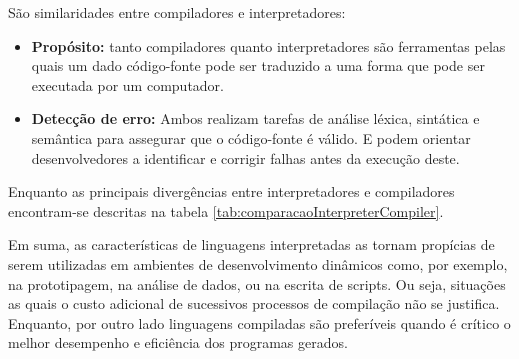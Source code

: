  {
	São similaridades entre compiladores e interpretadores:

	\begin{itemize}
		\item \textbf{Propósito:} tanto compiladores quanto interpretadores são
		      ferramentas pelas quais um dado código-fonte pode ser traduzido a
		      uma forma que pode ser executada por um computador.

		\item \textbf{Detecção de erro:} Ambos realizam tarefas de análise
		      léxica, sintática e semântica para assegurar que o código-fonte é
		      válido. E podem orientar desenvolvedores a identificar e corrigir
		      falhas antes da execução deste.
	\end{itemize}

	Enquanto as principais divergências entre interpretadores e compiladores
	encontram-se descritas na tabela \ref{tab:comparacaoInterpreterCompiler}.
	
	Em suma, as características de linguagens interpretadas as tornam propícias
	de serem utilizadas em ambientes de desenvolvimento dinâmicos como, por
	exemplo, na prototipagem, na análise de dados, ou na escrita de scripts. Ou
	seja, situações as quais o custo adicional de sucessivos processos de
	compilação não se justifica. Enquanto, por outro lado linguagens compiladas
	são preferíveis quando é crítico o melhor desempenho e eficiência dos
	programas gerados.			
}

 {
}

